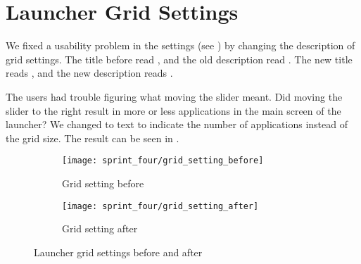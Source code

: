 
\section{Launcher Grid Settings}
\label{sec:launcher_grid_setting}
We fixed a usability problem in the \launcher settings (see ) by changing the description of grid settings. The title before read , and the old description read . The new title reads , and the new description reads .

The users had trouble figuring what moving the slider meant. Did moving the slider to the right result in more or less applications in the main screen of the launcher? We changed to text to indicate the number of applications instead of the grid size. The result can be seen in . 

\begin{figure}[!htbp]
    \centering

    \begin{subfigure}[t]{0.75\textwidth}
        \texttt{[image: sprint\_four/grid\_setting\_before]}
        \caption{Grid setting before}
        \label{fig:launcher_grid_settings_old}
        \vspace*{1cm}
    \end{subfigure}
    \begin{subfigure}[t]{0.75\textwidth}
        \texttt{[image: sprint\_four/grid\_setting\_after]}
        \caption{Grid setting after}
        \label{fig:launcher_grid_settings_new}
    \end{subfigure}
    
    \caption{Launcher grid settings before and after}
    \label{fig:launcher_grid_settings}
\end{figure}